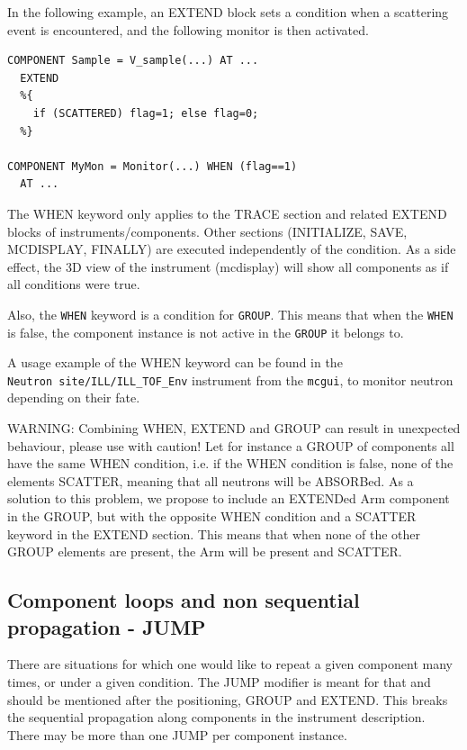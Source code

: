 In the following example, an EXTEND block sets a condition when a scattering event is encountered, and the following monitor is then activated.
\begin{verbatim}
COMPONENT Sample = V_sample(...) AT ...
  EXTEND
  %{
    if (SCATTERED) flag=1; else flag=0;
  %}

COMPONENT MyMon = Monitor(...) WHEN (flag==1)
  AT ...
\end{verbatim}

The WHEN keyword only applies to the TRACE section and related EXTEND blocks of instruments/components. Other sections (INITIALIZE, SAVE, MCDISPLAY, FINALLY) are executed independently of the condition. As a side effect, the 3D view of the instrument (mcdisplay) will show all components as if all conditions were true.

Also, the \verb+WHEN+ keyword is a condition for \verb+GROUP+. This means that when the \verb+WHEN+ is false, the component instance is not active in the \verb+GROUP+ it belongs to.

A usage example of the WHEN keyword can be found in the \\
\verb+Neutron site/ILL/ILL_TOF_Env+ instrument from the \verb+mcgui+, to monitor neutron depending on their fate.


WARNING: Combining WHEN, EXTEND and GROUP can result in unexpected behaviour, please use with caution! Let for instance a GROUP of components all have the same WHEN condition, i.e. if the WHEN condition is false, none of the elements SCATTER, meaning that all neutrons will be ABSORBed. As a solution to this problem, we propose to include an EXTENDed Arm component in the GROUP, but with the opposite WHEN condition and a SCATTER keyword in the EXTEND section. This means that when none of the other GROUP elements are present, the Arm will be present and SCATTER.


\subsection{Component loops and non sequential propagation - JUMP}
\label{s:instrdefs-extend-jump}

There are situations for which one would like to repeat a given component many times, or under a given condition. The JUMP modifier is meant for that and should be mentioned after the positioning, GROUP and EXTEND. This breaks the sequential propagation along components in the instrument description. There may be more than one JUMP per component instance.

